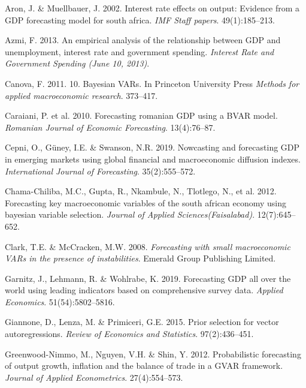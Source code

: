 \documentclass[11pt,preprint, authoryear]{elsarticle}
\numberwithin{equation}{section}
\numberwithin{figure}{section}
\numberwithin{table}{section}
\newlength{\cslhangindent}
\newenvironment{CSLReferences}%
  {\setlength{\parindent}{0pt}%
  \everypar{\setlength{\hangindent}{\cslhangindent}}\ignorespaces}%
  {\par}
\begin{document}
\hypertarget{refs}{}
\begin{CSLReferences}{1}{0}
\leavevmode{}%
Aron, J. \& Muellbauer, J. 2002. Interest rate effects on output:
Evidence from a GDP forecasting model for south africa. \emph{IMF Staff
papers}. 49(1):185--213.

\leavevmode{}%
Azmi, F. 2013. An empirical analysis of the relationship between GDP and
unemployment, interest rate and government spending. \emph{Interest Rate
and Government Spending (June 10, 2013)}.

\leavevmode{}%
Canova, F. 2011. 10. Bayesian VARs. In Princeton University Press
\emph{Methods for applied macroeconomic research}. 373--417.

\leavevmode{}%
Caraiani, P. et al. 2010. Forecasting romanian GDP using a BVAR model.
\emph{Romanian Journal of Economic Forecasting}. 13(4):76--87.

\leavevmode{}%
Cepni, O., Güney, I.E. \& Swanson, N.R. 2019. Nowcasting and forecasting
GDP in emerging markets using global financial and macroeconomic
diffusion indexes. \emph{International Journal of Forecasting}.
35(2):555--572.

\leavevmode{}%
Chama-Chiliba, M.C., Gupta, R., Nkambule, N., Tlotlego, N., et al. 2012.
Forecasting key macroeconomic variables of the south african economy
using bayesian variable selection. \emph{Journal of Applied
Sciences(Faisalabad)}. 12(7):645--652.

\leavevmode{}%
Clark, T.E. \& McCracken, M.W. 2008. \emph{Forecasting with small
macroeconomic VARs in the presence of instabilities}. Emerald Group
Publishing Limited.

\leavevmode{}%
Garnitz, J., Lehmann, R. \& Wohlrabe, K. 2019. Forecasting GDP all over
the world using leading indicators based on comprehensive survey data.
\emph{Applied Economics}. 51(54):5802--5816.

\leavevmode{}%
Giannone, D., Lenza, M. \& Primiceri, G.E. 2015. Prior selection for
vector autoregressions. \emph{Review of Economics and Statistics}.
97(2):436--451.

\leavevmode{}%
Greenwood-Nimmo, M., Nguyen, V.H. \& Shin, Y. 2012. Probabilistic
forecasting of output growth, inflation and the balance of trade in a
GVAR framework. \emph{Journal of Applied Econometrics}. 27(4):554--573.


\end{CSLReferences}
\end{document}
